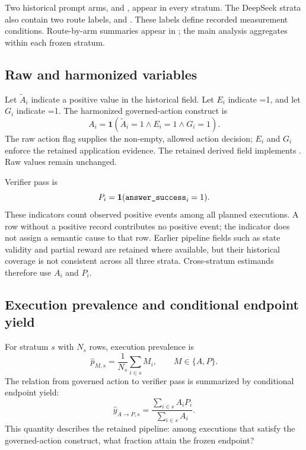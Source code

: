 Two historical prompt arms,  and , appear in every stratum. The DeepSeek strata also contain two route labels,  and . These labels define recorded measurement conditions. Route-by-arm summaries appear in ; the main analysis aggregates within each frozen stratum.

\subsection{Raw and harmonized variables}

Let $\widetilde A_i$ indicate a positive value in the historical  field. Let $E_i$ indicate =1, and let $G_i$ indicate =1. The harmonized governed-action construct is
\begin{equation}
A_i = \mathbf{1}(\widetilde A_i=1 \land E_i=1 \land G_i=1).
\label{eq:harmonized-action}
\end{equation}
The raw action flag supplies the non-empty, allowed action decision; $E_i$ and $G_i$ enforce the retained application evidence. The retained derived field implements . Raw values remain unchanged.

Verifier pass is
\begin{equation}
P_i = \mathbf{1}(\texttt{answer\_success}_i=1).
\label{eq:pass}
\end{equation}
These indicators count observed positive events among all planned executions. A row without a positive record contributes no positive event; the indicator does not assign a semantic cause to that row. Earlier pipeline fields such as state validity and partial reward are retained where available, but their historical coverage is not consistent across all three strata. Cross-stratum estimands therefore use $A_i$ and $P_i$.

\subsection{Execution prevalence and conditional endpoint yield}

For stratum $s$ with $N_s$ rows, execution prevalence is
\begin{equation}
\widehat p_{M,s}=\frac{1}{N_s}\sum_{i\in s}M_i,
\qquad M\in\{A,P\}.
\label{eq:prevalence}
\end{equation}
The relation from governed action to verifier pass is summarized by conditional endpoint yield:
\begin{equation}
\widehat y_{A\rightarrow P,s}
=
\frac{\sum_{i\in s}A_iP_i}{\sum_{i\in s}A_i}.
\label{eq:yield}
\end{equation}
This quantity describes the retained pipeline: among executions that satisfy the governed-action construct, what fraction attain the frozen endpoint?

